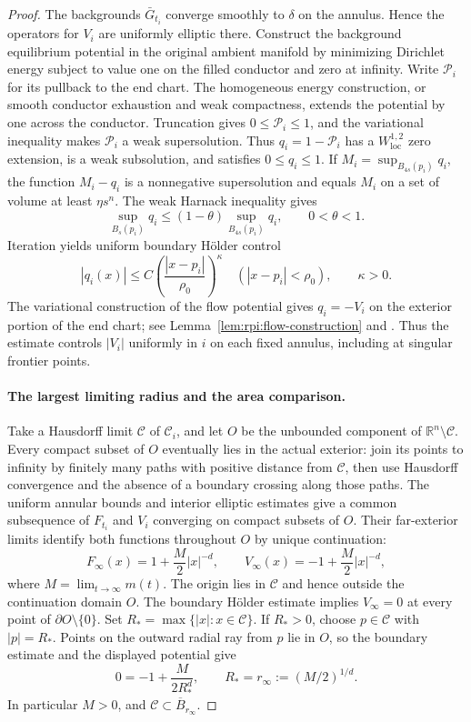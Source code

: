 \begin{proof}
The backgrounds $\bar G_{t_i}$ converge smoothly to $\delta$ on the
annulus. Hence the operators for $V_i$ are uniformly elliptic there.
Construct the background equilibrium potential in the original ambient
manifold by minimizing Dirichlet energy subject to value one on the
filled conductor and zero at infinity. Write $\mathcal P_i$ for its
pullback to the end chart. The homogeneous energy construction, or smooth
conductor exhaustion and weak compactness, extends the potential by one
across the conductor. Truncation gives $0\le\mathcal P_i\le1$, and the variational
inequality makes $\mathcal P_i$ a weak supersolution. Thus
$q_i=1-\mathcal P_i$ has a $W^{1,2}_{\mathrm{loc}}$ zero extension, is a weak
subsolution, and satisfies $0\le q_i\le1$. If
$M_i=\sup_{B_{4s}(p_i)}q_i$, the function $M_i-q_i$ is a nonnegative
supersolution and equals $M_i$ on a set of volume at least $\eta s^n$.
The weak Harnack inequality gives
\[
 \sup_{B_s(p_i)}q_i\leq(1-\theta)
       \sup_{B_{4s}(p_i)}q_i,
 \qquad 0<\theta<1.
\]
Iteration yields uniform boundary H\"older control
\[
 |q_i(x)|\leq C\left(\frac{|x-p_i|}{\rho_0}\right)^\kappa
 \quad (|x-p_i|<\rho_0),\qquad \kappa>0.
\]
The variational construction of the flow potential gives
$q_i=-V_i$ on the exterior portion of the end chart; see
Lemma~\ref{lem:rpi:flow-construction} and
\cite[Lemma~3.2]{BiZhu2026}. Thus the estimate controls $|V_i|$
uniformly in $i$ on each fixed annulus, including at singular
frontier points.

\paragraph{The largest limiting radius and the area comparison.}
Take a Hausdorff limit $\mathcal C$ of $\mathcal C_i$, and let $O$ be
the unbounded component of $\mathbb R^n\setminus\mathcal C$.
Every compact subset of $O$ eventually lies in the actual exterior:
join its points to infinity by finitely many paths with positive
distance from $\mathcal C$, then use Hausdorff convergence and the absence of
a boundary crossing along those paths.
The uniform annular bounds and interior elliptic estimates give a
common subsequence of $F_{t_i}$ and $V_i$ converging on compact subsets
of $O$. Their far-exterior limits identify both functions throughout
$O$ by unique continuation:
\[
 F_\infty(x)=1+\frac M2|x|^{-d},\qquad
 V_\infty(x)=-1+\frac M2|x|^{-d},
\]
where $M=\lim_{t\to\infty}m(t)$. The origin lies in $\mathcal C$ and hence
outside the continuation domain $O$.
The boundary H\"older estimate implies
$V_\infty=0$ at every point of $\partial O\setminus\{0\}$.
Set $R_* = \max\{|x|:x\in\mathcal C\}$. If $R_*>0$, choose $p\in\mathcal C$
with $|p|=R_*$. Points on the outward radial ray from $p$ lie in $O$,
so the boundary estimate and the displayed potential give
\[
 0=-1+\frac{M}{2R_*^d},\qquad
 R_*=r_\infty:=(M/2)^{1/d}.
\]
In particular $M>0$, and $\mathcal C\subset\overline B_{r_\infty}$.


\end{proof}
